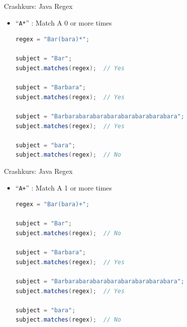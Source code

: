 \documentclass[18pt]{beamer}
\newcommand{\quotes}[1]{``#1''}
\begin{document}
\begin{frame}[fragile]{Crashkurs: Java Regex}
    \begin{itemize}
        \item \Large{\quotes{\alert{\texttt{A*}}}} : Match A 0 or more times

        \vspace{.2in}

        \begin{lstlisting}[language=Java,basicstyle=\scriptsize]
regex = "Bar(bara)*";

subject = "Bar";
subject.matches(regex);  // Yes

subject = "Barbara";
subject.matches(regex);  // Yes

subject = "Barbarabarabarabarabarabarabarabara";
subject.matches(regex);  // Yes

subject = "bara";
subject.matches(regex);  // No
        \end{lstlisting}

    \end{itemize}
\end{frame}

\begin{frame}[fragile]{Crashkurs: Java Regex}
    \begin{itemize}
        \item \Large{\quotes{\alert{\texttt{A+}}}} : Match A 1 or more times

        \vspace{.2in}

        \begin{lstlisting}[language=Java,basicstyle=\scriptsize]
regex = "Bar(bara)+";

subject = "Bar";
subject.matches(regex);  // No

subject = "Barbara";
subject.matches(regex);  // Yes

subject = "Barbarabarabarabarabarabarabarabara";
subject.matches(regex);  // Yes

subject = "bara";
subject.matches(regex);  // No
        \end{lstlisting}

    \end{itemize}
\end{frame}
\end{document}

